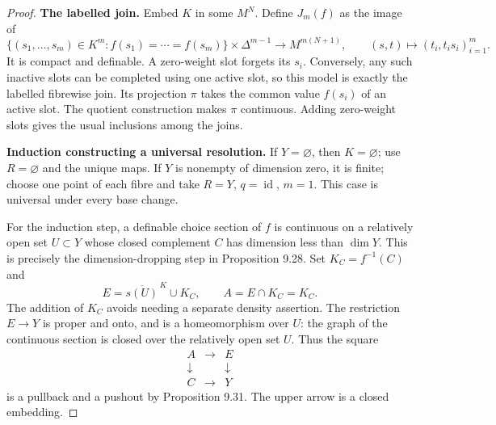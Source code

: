 \documentclass[11pt,a4paper]{article}
\theoremstyle{definition}
\begin{document}
\begin{proof}
\textbf{The labelled join.}
Embed \(K\) in some \(M^N\). Define \(J_m(f)\) as the image of
\begin{equation}
 \{(s_1,\ldots,s_m)\in K^m:f(s_1)=\cdots=f(s_m)\}
          \times\Delta^{m-1}
 \longrightarrow M^{m(N+1)},\qquad
 (s,t)\longmapsto(t_i,t_i s_i)_{i=1}^m.
 \label{equation-33}
\end{equation}
It is compact and definable. A zero-weight slot forgets its \(s_i\). Conversely, any such inactive slots can be completed using one active slot, so this model is exactly the labelled fibrewise join. Its projection \(\pi\) takes the common value \(f(s_i)\) of an active slot. The quotient construction makes \(\pi\) continuous. Adding zero-weight slots gives the usual inclusions among the joins.

\textbf{Induction constructing a universal resolution.}
If \(Y=\varnothing\), then \(K=\varnothing\); use \(R=\varnothing\) and the unique maps. If \(Y\) is nonempty of dimension zero, it is finite; choose one point of each fibre and take \(R=Y\), \(q=\operatorname{id}\), \(m=1\). This case is universal under every base change.

For the induction step, a definable choice section of \(f\) is continuous on a relatively open set \(U\subset Y\) whose closed complement \(C\) has dimension less than \(\dim Y\). This is precisely the dimension-dropping step in Proposition 9.28. Set \(K_C=f^{-1}(C)\) and
\begin{equation}
 E=\overline{s(U)}^{\,K}\cup K_C,\qquad
 A=E\cap K_C=K_C.
 \label{equation-34}
\end{equation}
The addition of \(K_C\) avoids needing a separate density assertion. The restriction \(E\to Y\) is proper and onto, and is a homeomorphism over \(U\): the graph of the continuous section is closed over the relatively open set \(U\). Thus the square
\begin{equation}
 \begin{matrix}
 A&\longrightarrow&E\\
 \downarrow&&\downarrow\\
 C&\longrightarrow&Y
 \end{matrix}
 \label{equation-35}
\end{equation}
is a pullback and a pushout by Proposition 9.31. The upper arrow is a closed embedding.


\end{proof}
\end{document}
